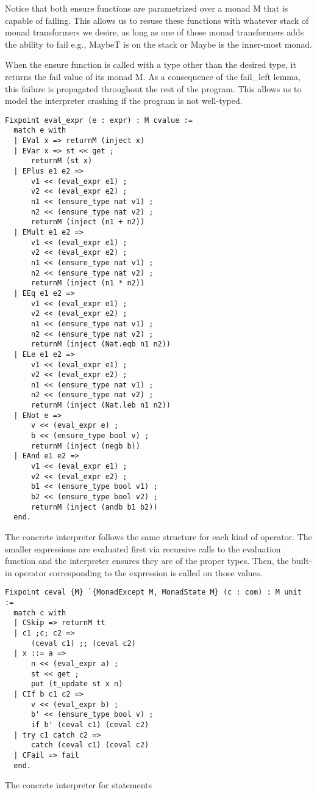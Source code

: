Notice that both ensure functions are parametrized over a monad M that is
capable of failing. This allows us to resuse these functions with whatever
stack of monad transformers we desire, as long as one of those monad
transformers adds the ability to fail e.g., MaybeT is on the stack or Maybe is
the inner-most monad.

When the ensure function is called with a type other than the desired type, it
returns the fail value of its monad M. As a consequence of the
fail\_left lemma, this failure is propagated throughout the rest of the
program. This allows us to model the interpreter crashing if the program is not
well-typed.

\begin{listing}[H]
\begin{verbatim}
Fixpoint eval_expr (e : expr) : M cvalue :=
  match e with
  | EVal x => returnM (inject x)
  | EVar x => st << get ;
      returnM (st x)
  | EPlus e1 e2 => 
      v1 << (eval_expr e1) ;
      v2 << (eval_expr e2) ;
      n1 << (ensure_type nat v1) ;
      n2 << (ensure_type nat v2) ;
      returnM (inject (n1 + n2))
  | EMult e1 e2 =>
      v1 << (eval_expr e1) ;
      v2 << (eval_expr e2) ;
      n1 << (ensure_type nat v1) ;
      n2 << (ensure_type nat v2) ;
      returnM (inject (n1 * n2))
  | EEq e1 e2 =>
      v1 << (eval_expr e1) ;
      v2 << (eval_expr e2) ;
      n1 << (ensure_type nat v1) ;
      n2 << (ensure_type nat v2) ;
      returnM (inject (Nat.eqb n1 n2))
  | ELe e1 e2 =>
      v1 << (eval_expr e1) ;
      v2 << (eval_expr e2) ;
      n1 << (ensure_type nat v1) ;
      n2 << (ensure_type nat v2) ;
      returnM (inject (Nat.leb n1 n2))
  | ENot e =>
      v << (eval_expr e) ;
      b << (ensure_type bool v) ;
      returnM (inject (negb b))
  | EAnd e1 e2 =>
      v1 << (eval_expr e1) ;
      v2 << (eval_expr e2) ;
      b1 << (ensure_type bool v1) ;
      b2 << (ensure_type bool v2) ;
      returnM (inject (andb b1 b2))
  end.
\end{verbatim}
\end{listing}

The concrete interpreter follows the same structure for each kind of operator.
The smaller expressions are evaluated first via recursive calls to the
evaluation function and the interpreter
ensures they are of the proper types. Then, the built-in operator corresponding
to the expression is called on those values.

\begin{listing}[H]
\begin{verbatim}
Fixpoint ceval {M} `{MonadExcept M, MonadState M} (c : com) : M unit :=
  match c with
  | CSkip => returnM tt
  | c1 ;c; c2 => 
      (ceval c1) ;; (ceval c2)
  | x ::= a => 
      n << (eval_expr a) ;
      st << get ;
      put (t_update st x n)
  | CIf b c1 c2 => 
      v << (eval_expr b) ;
      b' << (ensure_type bool v) ;
      if b' (ceval c1) (ceval c2)
  | try c1 catch c2 =>
   	  catch (ceval c1) (ceval c2)
  | CFail => fail
  end.
\end{verbatim}
\caption{The concrete interpreter for statements}
\label{lst:concrete_statements}
\end{listing}


